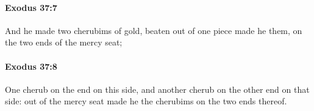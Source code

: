 		\paragraph{Exodus 37:7} %
			\label{EXODUS-37-7}

			And he made two cherubims of gold, beaten out of one piece made he them, on the two ends of the mercy seat;


		\paragraph{Exodus 37:8} %
			\label{EXODUS-37-8}

			One cherub on the end on this side, and another cherub on the other end on that side: out of the mercy seat made he the cherubims on the two ends thereof.


